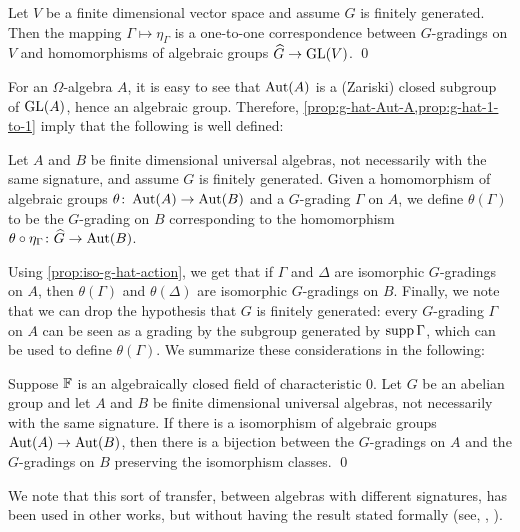 \begin{prop}\label{prop:g-hat-1-to-1}
    Let $V$ be a finite dimensional vector space and assume $G$ is finitely generated. 
    Then the mapping $\Gamma \mapsto \eta_\Gamma$ is a one-to-one correspondence between $G$-gradings on $V$ and homomorphisms of algebraic groups $\widehat G \to \operatorname{GL}(V)$. \qed
\end{prop}


For an $\Omega$-algebra $A$, it is easy to see that $\operatorname{Aut} (A)$ is a (Zariski) closed subgroup of $\operatorname{GL} (A)$, hence an algebraic group.
Therefore, \cref{prop:g-hat-Aut-A,prop:g-hat-1-to-1} imply that the following is well defined:

\begin{defi}
    Let $A$ and $B$ be finite dimensional universal algebras, not necessarily with the same signature, and assume $G$ is finitely generated.  
    Given a homomorphism of algebraic groups $\theta\colon \operatorname{Aut}(A) \to \operatorname{Aut}(B)$ and a $G$-grading $\Gamma$ on $A$, we define $\theta(\Gamma)$ to be the $G$-grading on $B$ corresponding to the homomorphism $\theta \circ \eta_\Gamma\colon \widehat G \to \operatorname{Aut}(B)$. 
\end{defi}

Using \cref{prop:iso-g-hat-action}, we get that if $\Gamma$ and $\Delta$ are isomorphic $G$-gradings on $A$, then $\theta(\Gamma)$ and $\theta(\Delta)$ are isomorphic $G$-gradings on $B$. 
Finally, we note that we can drop the hypothesis that $G$ is finitely generated: every $G$-grading $\Gamma$ on $A$ can be seen as a grading by the subgroup generated by $\operatorname{supp} \Gamma$, which can be used to define $\theta (\Gamma)$. 
We summarize these considerations in the following:

\begin{thm}\label{thm:transfer-of-gradings}
    Suppose $\mathbb{F}$ is an algebraically closed field of characteristic $0$. 
    Let $G$ be an abelian group and let $A$ and $B$ be finite dimensional universal algebras, not necessarily with the same signature. 
    If there is a isomorphism of algebraic groups $\operatorname{Aut}(A) \to \operatorname{Aut}(B)$, then there is a bijection between the $G$-gradings on $A$ and the $G$-gradings on $B$ preserving the isomorphism classes. \qed
\end{thm}

We note that this sort of transfer, between algebras with different signatures, has been used in other works, but without having the result stated formally (see, \eg,  \cite[Remark 1.40]{livromicha}).

